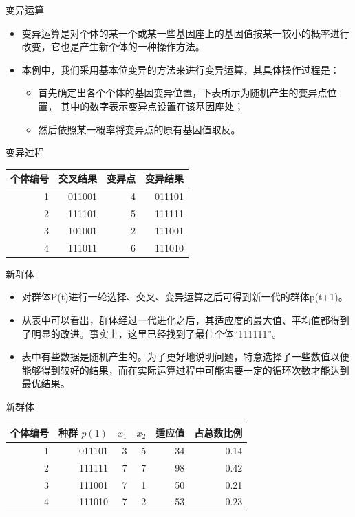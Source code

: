 \documentclass[presentation]{beamer}
\begin{document}
\begin{frame}[label={sec:orgcf6789c}]{变异运算}
\begin{itemize}
\item <2-> 变异运算是对个体的某一个或某一些基因座上的基因值按某一较小的概率进行改变，它也是产生新个体的一种操作方法。
\item <3-> 本例中，我们采用基本位变异的方法来进行变异运算，其具体操作过程是：
\begin{itemize}
\item 首先确定出各个个体的基因变异位置，下表所示为随机产生的变异点位置，
其中的数字表示变异点设置在该基因座处；
\item 然后依照某一概率将变异点的原有基因值取反。
\end{itemize}
\end{itemize}
\begin{block}{变异过程}
\begin{center}
\begin{tabular}{rrrr}
个体编号 & 交叉结果 & 变异点 & 变异结果\\
\hline
1 & 011001 & 4 & 011101\\
2 & 111101 & 5 & 111111\\
3 & 101001 & 2 & 111001\\
4 & 111011 & 6 & 111010\\
\end{tabular}
\end{center}
\end{block}
\end{frame}
\begin{frame}[label={sec:org3e70233}]{新群体}
\begin{itemize}
\item <2-> 对群体P(t)进行一轮选择、交叉、变异运算之后可得到新一代的群体p(t+1)。
\item <4-> 从表中可以看出，群体经过一代进化之后，其适应度的最大值、平均值都得到了明显的改进。事实上，这里已经找到了最佳个体“111111”。
\item <5-> 表中有些数据是随机产生的。为了更好地说明问题，特意选择了一些数值以便能够得到较好的结果，而在实际运算过程中可能需要一定的循环次数才能达到最优结果。
\end{itemize}
\begin{block}{新群体}
\begin{center}
\begin{tabular}{rrrrrr}
个体编号 & 种群 \(p(1)\) & \(x_1\) & \(x_2\) & 适应值 & 占总数比例\\
\hline
1 & 011101 & 3 & 5 & 34 & 0.14\\
2 & 111111 & 7 & 7 & 98 & 0.42\\
3 & 111001 & 7 & 1 & 50 & 0.21\\
4 & 111010 & 7 & 2 & 53 & 0.23\\
\end{tabular}
\end{center}
\end{block}
\end{frame}
\end{document}

